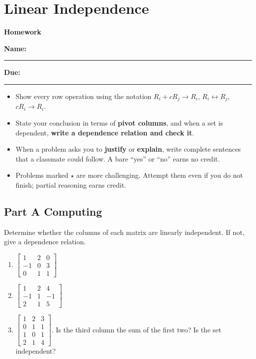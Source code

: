 \documentclass[11pt]{article}
\begin{document}
\section{Linear Independence}

{\Large\bfseries Homework}\par

\textbf{Name:} \rule{2.6in}{0.4pt}\qquad\textbf{Due:} \rule{1.4in}{0.4pt}

\begin{howto}
\begin{itemize}[nosep]
  \item Show every row operation using the notation $R_i+cR_j\to R_i$, $R_i\leftrightarrow R_j$, $cR_i\to R_i$.
  \item State your conclusion in terms of \textbf{pivot columns}, and when a set is dependent, \textbf{write a dependence relation and check it}.
  \item When a problem asks you to \textbf{justify} or \textbf{explain}, write complete sentences that a classmate
        could follow. A bare ``yes'' or ``no'' earns no credit.
  \item Problems marked $\star$ are more challenging. Attempt them even if you do not finish; partial
        reasoning earns credit.
\end{itemize}
\end{howto}

\subsection*{Part A \quad Computing}

Determine whether the columns of each matrix are linearly independent. If not, give a dependence relation.
\begin{enumerate}
  \item $\begin{bmatrix}1&2&0\\-1&0&3\\0&1&1\end{bmatrix}$
  \item $\begin{bmatrix}1&2&4\\-1&1&-1\\2&1&5\end{bmatrix}$
  \item $\begin{bmatrix}1&2&3\\0&1&1\\1&0&1\\2&1&4\end{bmatrix}$. Is the third column the sum of the first two? Is the set independent?
\end{enumerate}
\end{document}

